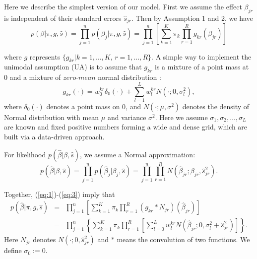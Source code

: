 \documentclass[11pt]{article}
\newtheorem{assumption}{Assumption}
\begin{document}

Here we describe the simplest version of our model. First we assume the effect $\beta_{jr}$ is independent of their standard errors $\hat s_{jr}$. Then by Assumption 1 and 2, we have
\begin{equation}
p(\beta|\pi,g,\hat s) = \prod_{j=1}^np(\beta_j|\pi,g,\hat s) = \prod_{j=1}^n \left [\sum_{k=1}^K\pi_k\prod_{r=1}^R  g_{kr}(\beta_{jr})\right ]
\label{eq:1}
\end{equation}

where $g$ represents $\{g_{kr}|k = 1,\ldots,K$, $r=1,\ldots,R\}$. A simple way to implement the unimodal assumption (UA) is to assume that $g_{kr}$ is a mixture of a point mass at 0 and a mixture of $zero$-$mean$ normal distribution \cite{ash}:
\begin{equation}
g_{kr}(\cdot) =  w_0^{kr}\delta_0(\cdot)+\sum_{l=1}^L w_l^{kr}N(\cdot;0,\sigma_l^2),
\label{eq:2}
\end{equation}
where $\delta_0(\cdot)$ denotes a point mass on 0, and $N(\cdot;\mu,\sigma^2)$ denotes the density of Normal distribution with mean $\mu$ and variance $\sigma^2$. Here we assume  $\sigma_1,\sigma_2,\ldots,\sigma_L$ are known and fixed positive numbers forming a wide and dense grid, which are built via a data-driven approach.

For likelihood $p(\hat \beta|\beta,\hat s)$, we assume a Normal approximation:
\begin{equation}
p(\hat \beta|\beta,\hat s) = \prod_{j=1}^np(\hat \beta_j|\beta_j,\hat s) = \prod_{j=1}^n\prod_{r=1}^RN(\hat\beta_{jr};\beta_{jr},\hat s_{jr}^2).
\label{eq:3}
\end{equation}

Together, (\ref{eq:1})-(\ref{eq:3}) imply that 
\begin{eqnarray}
p(\hat\beta|\pi,g,\hat s) &=& \prod_{j=1}^n\left[\sum_{k=1}^K\pi_k\prod_{r=1}^R(g_{kr}*N_{jr})(\hat\beta_{jr})\right] \nonumber \\ 
&=& \prod_{j=1}^n\left\{\sum_{k=1}^K\pi_k\prod_{r=1}^R\left[ \sum_{l=0}^Lw_l^{kr}N(\hat\beta_{jr};0,\sigma_l^2+\hat s_{jr}^2)\right]\right\}.
\label{eq:4}
\end{eqnarray}
Here $N_{jr}$ denotes $N(\cdot;0,\hat s_{jr}^2)$ and $*$ means the convolution of two functions. We define $\sigma_0:=0$.
\end{document}
